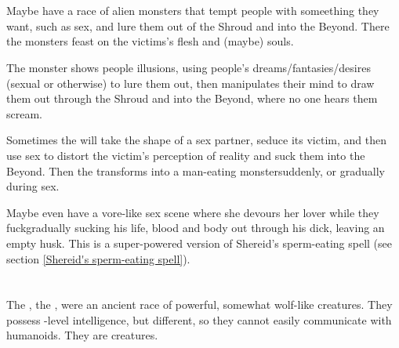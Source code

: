 \section{\Succubus}
\index{\succubus}
Maybe have a race of alien monsters that tempt people with someething they want, such as sex, and lure them out of the Shroud and into the Beyond. 
There the monsters feast on the victims's flesh and (maybe) souls. 

The monster shows people illusions, using people's dreams/fantasies/desires (sexual or otherwise) to lure them out, then manipulates their mind to draw them out through the Shroud and into the Beyond, where no one hears them scream.

Sometimes the \succubus{} will take the shape of a sex partner, seduce its victim, and then use sex to distort the victim's perception of reality and suck them into the Beyond. Then the \succubus{} transforms into a man-eating monster\dash suddenly, or gradually during sex. 

Maybe even have a vore-like sex scene where she devours her lover while they fuck\dash gradually sucking his life, blood and body out through his dick, leaving an empty husk. This is a super-powered version of Shereid's sperm-eating spell (see section \ref{Shereid's sperm-eating spell}).

















\section{\Vorcanth}
\index{\Vorcanth}
The \MoonWolves{}, the , were an ancient race of powerful, somewhat wolf-like creatures. 
They possess \human-level intelligence, but different, so they cannot easily communicate with humanoids. 
They are \Wylde{} creatures.

